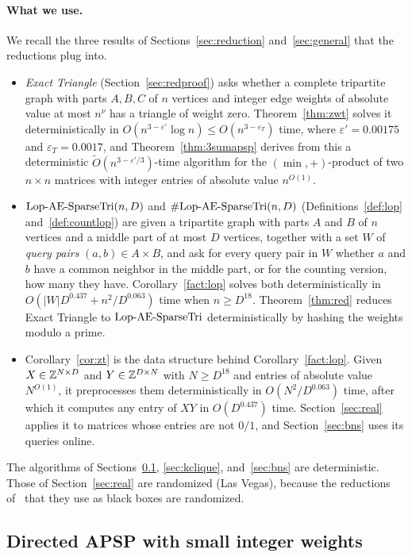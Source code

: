 \paragraph{What we use.}
We recall the three results of Sections~\ref{sec:reduction} and~\ref{sec:general} that the reductions plug into.
\begin{itemize}
\item \emph{Exact Triangle} (Section~\ref{sec:redproof}) asks whether a complete tripartite graph with parts $A,B,C$ of $n$ vertices and integer edge weights of absolute value at most $n^\nu$ has a triangle of weight zero. Theorem~\ref{thm:zwt} solves it deterministically in $O(n^{3-\varepsilon'}\log n)\leq O(n^{3-\varepsilon_T})$ time, where $\varepsilon'=0.00175$ and $\varepsilon_T=0.0017$, and Theorem~\ref{thm:3sumapsp} derives from this a deterministic $\tilde{O}(n^{3-\varepsilon'/3})$-time algorithm for the $(\min,+)$-product of two $n\times n$ matrices with integer entries of absolute value $n^{O(1)}$.
\item $\mathrm{Lop}\text{-}\mathrm{AE}\text{-}\mathrm{SparseTri}(n,D)$ and $\#\mathrm{Lop}\text{-}\mathrm{AE}\text{-}\mathrm{SparseTri}(n,D)$ (Definitions~\ref{def:lop} and~\ref{def:countlop}) are given a tripartite graph with parts $A$ and $B$ of $n$ vertices and a middle part of at most $D$ vertices, together with a set $W$ of \emph{query pairs} $(a,b)\in A\times B$, and ask for every query pair in $W$ whether $a$ and $b$ have a common neighbor in the middle part, or for the counting version, how many they have. Corollary~\ref{fact:lop} solves both deterministically in $O(|W|D^{0.437}+n^2/D^{0.063})$ time when $n\ge D^{18}$. Theorem~\ref{thm:red} reduces Exact Triangle to $\mathrm{Lop}\text{-}\mathrm{AE}\text{-}\mathrm{SparseTri}$ deterministically by hashing the weights modulo a prime.
\item Corollary~\ref{cor:zt} is the data structure behind Corollary~\ref{fact:lop}. Given $X\in\mathbb{Z}^{N\times D}$ and $Y\in\mathbb{Z}^{D\times N}$ with $N\ge D^{18}$ and entries of absolute value $N^{O(1)}$, it preprocesses them deterministically in $O(N^2/D^{0.063})$ time, after which it computes any entry of $XY$ in $O(D^{0.437})$ time. Section~\ref{sec:real} applies it to matrices whose entries are not $0/1$, and Section~\ref{sec:bns} uses its queries online.
\end{itemize}
{The algorithms of Sections~\ref{sec:dirapsp}, \ref{sec:kclique}, and~\ref{sec:bns} are deterministic. Those of Section~\ref{sec:real} are randomized (Las Vegas), because the reductions of~\cite{CVX22} that they use as black boxes are randomized.}

\subsection{Directed APSP with small integer weights}\label{sec:dirapsp}

